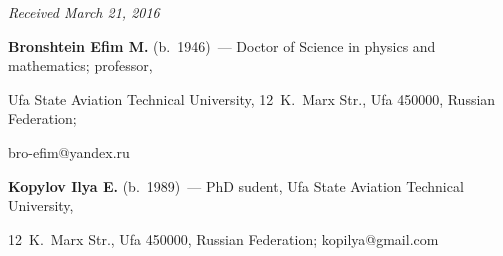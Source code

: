 \vspace*{-3pt}





\hfill{\small\textit{Received March 21, 2016}}


     


     \Contr


     


\noindent


\textbf{Bronshtein Efim M.} (b.\ 1946)~--- Doctor of Science in physics and mathematics; professor, 


Ufa State Aviation Technical University, 12~K.~Marx Str., Ufa 450000, Russian Federation;  


\mbox{bro-efim@yandex.ru}


      


      \vspace*{3pt}


      


\noindent


      \textbf{Kopylov Ilya E.} (b.\ 1989)~--- PhD sudent, Ufa State Aviation Technical University, 


12~K.~Marx Str., Ufa 450000, Russian Federation; \mbox{kopilya@gmail.com}


\label{end\stat}








\renewcommand{\bibname}{\protect\rm Литература}


